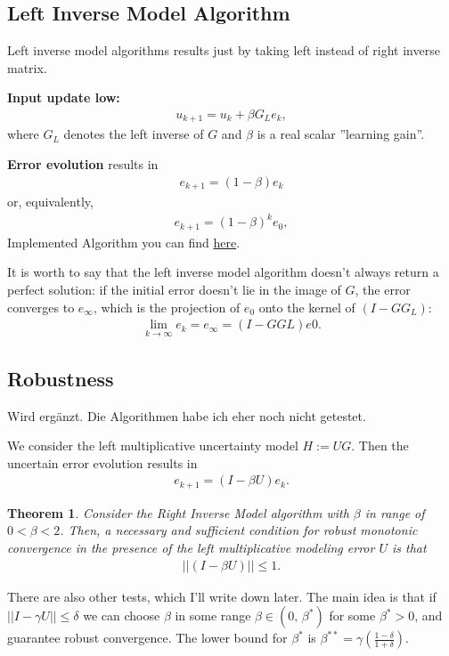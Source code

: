 \documentclass[12pt,ngerman]{article}
\def\l{\left(}
\def\r{\right)}
\newtheorem{theorem}{Theorem}
\begin{document}
	\subsection{Left Inverse Model Algorithm}
	
Left inverse model algorithms results just by taking left instead of right inverse matrix. 

	\textbf{Input update low:}
	\begin{align}
	u_{k+1} = u_k + \beta G_L e_k,
	\end{align}
	where $G_L$ denotes the left inverse of $G$ and $\beta$ is a real scalar ''learning gain''. 
	
	\textbf{Error evolution} results in 
	\begin{align*}
	e_{k+1} = (1-\beta) e_k
	\end{align*}
	or, equivalently, 
	\begin{align*}
	e_{k+1} = (1-\beta)^k e_0,
	\end{align*}
	Implemented Algorithm you can find \href{run ./MATLAB/LIA.m}{here}. 
	
	It is worth to say that the left inverse model algorithm doesn't always return a perfect solution: if the initial error doesn't lie in the image of $G$, the error converges to $e_\infty$, which is the projection of $e_0$ onto the kernel of $(I - G G_L)$: 
	\begin{align*}
    \lim_{k \to \infty} e_k = e_\infty = (I - G GL)e0.
	\end{align*}
	
	\subsection{Robustness}
	
	{\color{pink} Wird ergänzt. Die Algorithmen habe ich eher noch nicht getestet.}
	
We consider the left multiplicative uncertainty model $H:= UG$. Then the uncertain error evolution results in
\begin{align}
e_{k+1} = (I - \beta U ) e_k.
\end{align}
\begin{theorem}
	Consider the Right Inverse Model algorithm with $\beta$ in range of $0<\beta<2$. Then, a necessary and sufficient condition for robust monotonic convergence in the presence of the left multiplicative modeling error $U$ is that
	\begin{align*}
	|| (I - \beta U) || \leq 1.
	\end{align*}
\end{theorem}
{\color{pink}There are also other tests, which I'll write down later. The main idea is that if $||I - \gamma U||\leq \delta$ we can choose $\beta$ in some range $\beta \in (0, \, \beta^*)$ for some $\beta^*>0$, and guarantee robust convergence. The lower bound for $\beta^*$ is $\beta^{**} = \gamma \l \frac{1-\delta}{1+\delta}\r$.}
\end{document}
